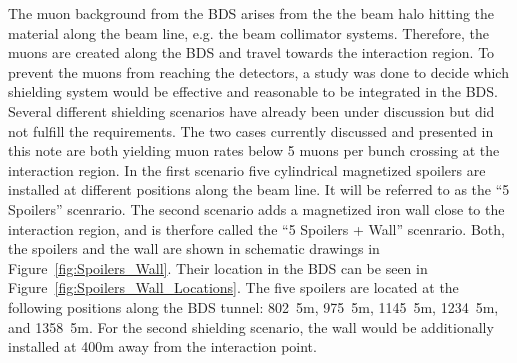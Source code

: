\documentclass[12pt]{article}
\begin{document}
The muon background from the BDS arises from the the beam halo hitting the material along the beam line, e.g. the beam collimator systems.
Therefore, the muons are created along the BDS and travel towards the interaction region.
To prevent the muons from reaching the detectors, a study was done to decide which shielding system would be effective and reasonable to be integrated in the BDS.
Several different shielding scenarios have already been under discussion but did not fulfill the requirements.
The two cases currently discussed and presented in this note are both yielding muon rates below 5 muons per bunch crossing at the interaction region.
In the first scenario five cylindrical magnetized spoilers are installed at different positions along the beam line.
It will be referred to as the ``5 Spoilers'' scenrario.
The second scenario adds a magnetized iron wall close to the interaction region, and is therfore called the ``5 Spoilers + Wall'' scenrario.
Both, the spoilers and the wall are shown in schematic drawings in Figure~\ref{fig:Spoilers_Wall}.
Their location in the BDS can be seen in Figure~\ref{fig:Spoilers_Wall_Locations}.
The five spoilers are located at the following positions along the BDS tunnel: \unit{802.5}{m}, \unit{975.5}{m}, \unit{1145.5}{m}, \unit{1234.5}{m}, and \unit{1358.5}{m}.
For the second shielding scenario, the wall would be additionally installed at \unit{400}{m} away from the interaction point.\cite{Lewis}
\end{document}
